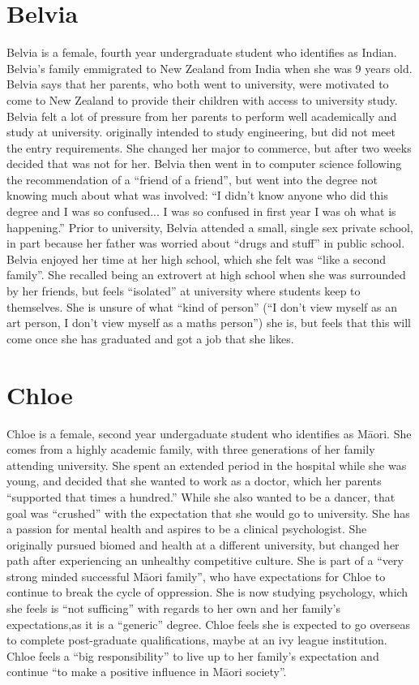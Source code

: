 \section{Belvia}
Belvia is a female, fourth year undergraduate student who identifies as Indian. Belvia's family emmigrated to New Zealand from India when she was 9 years old. Belvia says that her parents, who both went to university, were motivated to come to New Zealand to provide their children with access to university study. Belvia felt a lot of pressure from her parents to perform well academically and study at university. originally intended to study engineering, but did not meet the entry requirements. She changed her major to commerce, but after two weeks decided that was not for her. Belvia then went in to computer science following the recommendation of a ``friend of a friend'', but went into the degree not knowing much about what was involved: ``I didn’t know anyone who did this degree and I was so confused... I was so confused in first year I was oh what is happening.'' Prior to university, Belvia attended a small, single sex private school, in part because her father was worried about ``drugs and stuff'' in public school. Belvia enjoyed her time at her high school, which she felt was ``like a second family''. She recalled being an extrovert at high school when she was surrounded by her friends, but feels ``isolated'' at university where students keep to themselves. She is unsure of what ``kind of person'' (``I don’t view myself as an art person, I don't view myself as a maths person'') she is, but feels that this will come once she has graduated and got a job that she likes.


\section{Chloe}
Chloe is a female, second year undergaduate student who identifies as M\={a}ori. She comes from a highly academic family, with three generations of her family attending university. She spent an extended period in the hospital while she was young, and decided that she wanted to work as a doctor, which her parents ``supported that times a hundred.'' While she also wanted to be a dancer, that goal was ``crushed'' with the expectation that she would go to university. She has a passion for mental health and aspires to be a clinical psychologist. She originally pursued biomed and health at a different university, but changed her path after experiencing an unhealthy competitive culture. She is part of a ``very strong minded successful M\={a}ori family'', who have expectations for Chloe to continue to break the cycle of oppression. She is now studying psychology, which she feels is ``not sufficing'' with regards to her own and her family's expectations,as it is a ``generic'' degree. Chloe feels she is expected to go overseas to complete post-graduate qualifications, maybe at an ivy league institution. Chloe feels a ``big responsibility'' to live up to her family's expectation and continue ``to make a positive influence in M\={a}ori society''.





